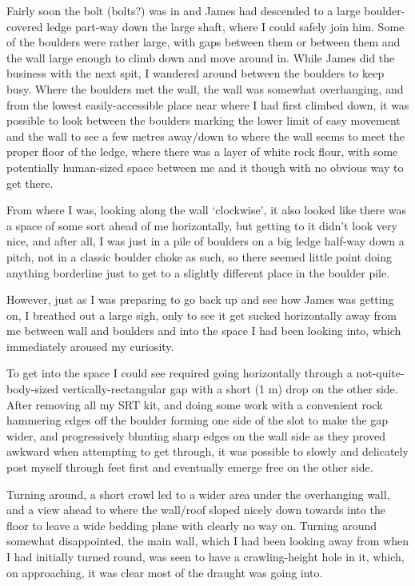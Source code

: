 Fairly soon the bolt (bolts?) was in and James had descended to a large
boulder-covered ledge part-way down the large shaft, where I could
safely join him. Some of the boulders were rather large, with gaps
between them or between them and the wall large enough to climb down and
move around in. While James did the business with the next spit, I
wandered around between the boulders to keep busy. Where the boulders
met the wall, the wall was somewhat overhanging, and from the lowest
easily-accessible place near where I had first climbed down, it was
possible to look between the boulders marking the lower limit of easy
movement and the wall to see a few metres away/down to where the wall
seems to meet the proper floor of the ledge, where there was a layer of
white rock flour, with some potentially human-sized space between me and
it though with no obvious way to get there.

From where I was, looking along the wall `clockwise', it also looked
like there was a space of some sort ahead of me horizontally, but
getting to it didn't look very nice, and after all, I was just in a pile
of boulders on a big ledge half-way down a pitch, not in a classic
boulder choke as such, so there seemed little point doing anything
borderline just to get to a slightly different place in the boulder
pile.

However, just as I was preparing to go back up and see how James was
getting on, I breathed out a large sigh, only to see it get sucked
horizontally away from me between wall and boulders and into the space I
had been looking into, which immediately aroused my curiosity.

To get into the space I could see required going horizontally through a
not-quite-body-sized vertically-rectangular gap with a short (1 m) drop
on the other side. After removing all my SRT kit, and doing some work
with a convenient rock hammering edges off the boulder forming one side
of the slot to make the gap wider, and progressively blunting sharp
edges on the wall side as they proved awkward when attempting to get
through, it was possible to slowly and delicately post myself through
feet first and eventually emerge free on the other side.

Turning around, a short crawl led to a wider area under the overhanging
wall, and a view ahead to where the wall/roof sloped nicely down towards
into the floor to leave a wide bedding plane with clearly no way on.
Turning around somewhat disappointed, the main wall, which I had been
looking away from when I had initially turned round, was seen to have a
crawling-height hole in it, which, on approaching, it was clear most of
the draught was going into.

